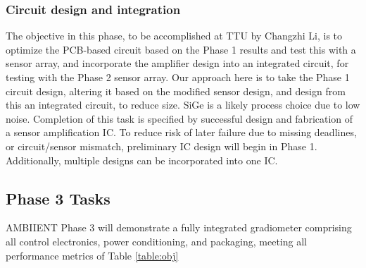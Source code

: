 \subsubsection{Circuit design and integration}\label{sec:p2:cir}

The objective in this phase, to be accomplished at TTU by Changzhi Li, is to optimize the PCB-based circuit based on the Phase 1 results and test this with a sensor array, and incorporate the amplifier design into an integrated circuit, for testing with the Phase 2 sensor array. Our approach here is to take the Phase 1 circuit design, altering it based on the modified sensor design, and design from this an integrated circuit, to reduce size. SiGe is a likely process choice due to low noise. Completion of this task is specified by successful design and fabrication of a sensor amplification IC. To reduce risk of later failure due to missing deadlines, or circuit/sensor mismatch, preliminary IC design will begin in Phase 1. Additionally, multiple designs can be incorporated into one IC.

\subsection{Phase 3 Tasks}
AMBIIENT Phase 3 will demonstrate a fully integrated gradiometer comprising all control
electronics, power conditioning, and packaging, meeting all performance metrics of Table  \ref{table:obj}

